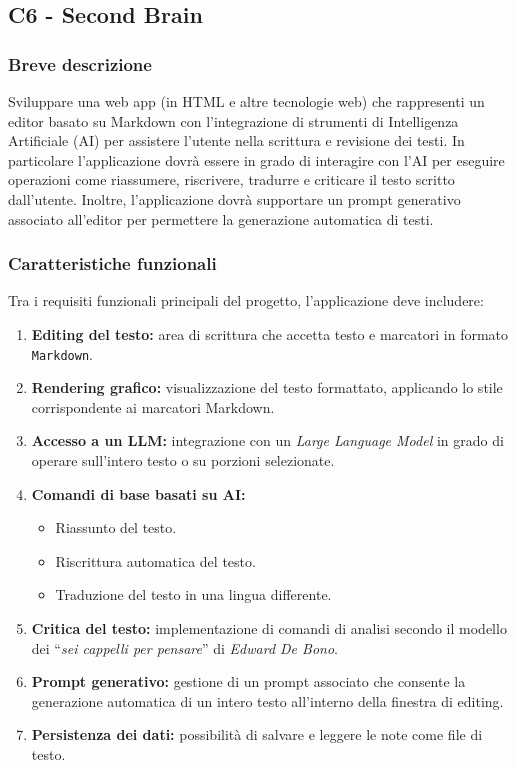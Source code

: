 \documentclass[a4paper,11pt]{article}
\begin{document}
\subsection{C6 - Second Brain}

\subsubsection{Breve descrizione}
Sviluppare una web app (in HTML e altre tecnologie web) che rappresenti un editor basato su Markdown con l'integrazione di strumenti di Intelligenza Artificiale (AI) per assistere l'utente nella scrittura e revisione dei testi.
In particolare l'applicazione dovrà essere in grado di interagire con l'AI per eseguire operazioni come riassumere, riscrivere, tradurre e criticare il testo scritto dall'utente. Inoltre, l'applicazione dovrà supportare un prompt generativo associato all'editor per permettere la generazione automatica di testi.
\subsubsection{Caratteristiche funzionali}
Tra i requisiti funzionali principali del progetto, l'applicazione deve includere:
\begin{enumerate}[noitemsep, topsep=0pt]
  \item \textbf{Editing del testo:} area di scrittura che accetta testo e marcatori in formato \texttt{Markdown}.
  \item \textbf{Rendering grafico:} visualizzazione del testo formattato, applicando lo stile corrispondente ai marcatori Markdown.
  \item \textbf{Accesso a un LLM:} integrazione con un \textit{Large Language Model} in grado di operare sull'intero testo o su porzioni selezionate.
  \item \textbf{Comandi di base basati su AI:}
  \begin{itemize}
    \item Riassunto del testo.
    \item Riscrittura automatica del testo.
    \item Traduzione del testo in una lingua differente.
  \end{itemize}
  
  \item \textbf{Critica del testo:} implementazione di comandi di analisi secondo il modello dei “\textit{sei cappelli per pensare}” di \textit{Edward De Bono}.
  \item \textbf{Prompt generativo:} gestione di un prompt associato che consente la generazione automatica di un intero testo all'interno della finestra di editing.
  \item \textbf{Persistenza dei dati:} possibilità di salvare e leggere le note come file di testo.
\end{enumerate}
\end{document}
